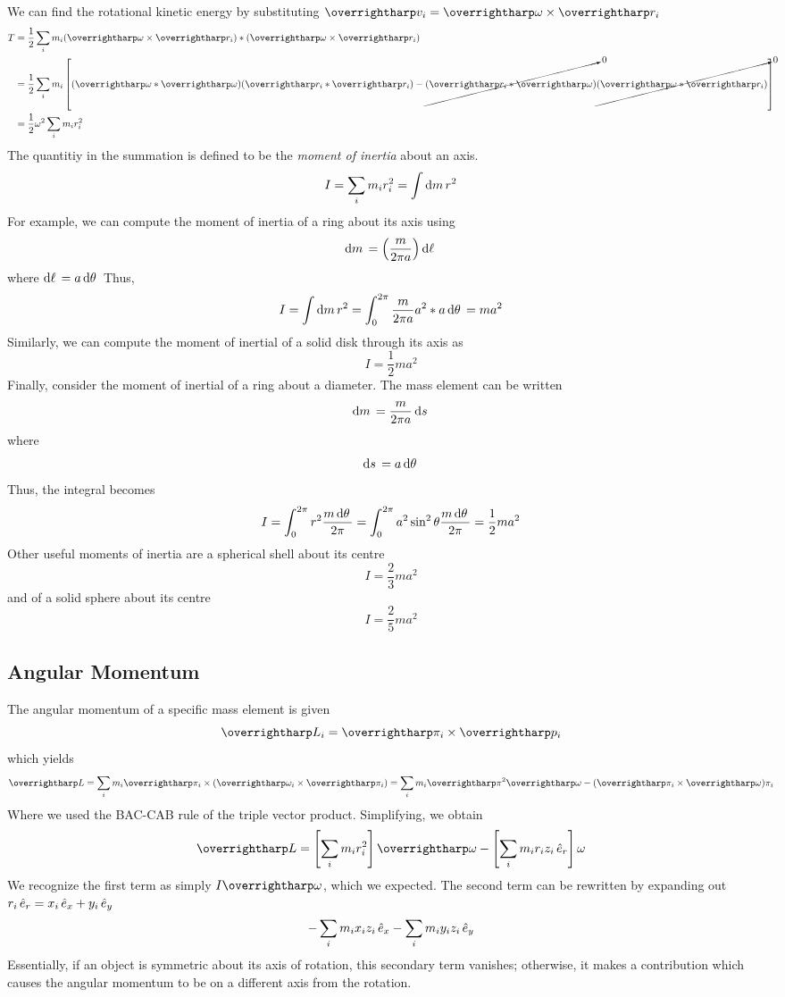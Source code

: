 We can find the rotational kinetic energy by substituting \(\vv v_i = \vv\omega \times \vv r_i\)
\begin{align}
	T&= \frac{1}{2}\sum_i m_i (\vv\omega\times \vv r_i) * (\vv\omega\times\vv r_i)\nonumber\\
	 &=\frac{1}{2}\sum_i m_i \left[ (\vv \omega*\vv\omega)(\vv r_i *\vv r_i) - \cancelto{0}{(\vv r_i * \vv\omega)}\cancelto{0}{(\vv\omega*\vv r_i)}\right]\nonumber\\
	 &=\frac{1}{2}\omega^2\sum_i m_i r_i^2
\end{align}
The quantitiy in the summation is defined to be the \emph{moment of inertia} about an axis.
\begin{equation}
	I = \sum_i m_i r_i^2 = \int\d{m}r^2
\end{equation}
For example, we can compute the moment of inertia of a ring about its axis using
\[\d{m} = \left(\frac{m}{2\pi a}\right) \d{\ell}\]
where \(\d\ell = a\d\theta\)
Thus,
\[I = \int \d{m} r^2 = \int_0^{2\pi} \frac{m}{2\pi a} a^2 * a\d\theta = m a^2\]
Similarly, we can compute the moment of inertial of a solid disk through its axis as
\[I = \frac{1}{2} ma^2\]
Finally, consider the moment of inertial of a ring about a diameter. The mass element can be written
\[\d{m} = \frac{m}{2\pi a} \d{s}\]
where
\[\d{s} = a\d\theta\]
Thus, the integral becomes
\[I = \int_{0}^{2\pi} r^2\frac{m\d\theta}{2\pi} = \int_0^{2\pi}a^2\sin^2\theta\frac{m\d\theta}{2\pi} = \frac{1}{2}ma^2\]
Other useful moments of inertia are a spherical shell about its centre
\[I = \frac{2}{3}ma^2\]
and of a solid sphere about its centre
\[I = \frac{2}{5}ma^2\]

\subsection{Angular Momentum}
The angular momentum of a specific mass element is given
\[\vv L_i = \vv{\pi_i}\times \vv p_i\]
which yields
\[\vv L = \sum_i m_i \vv \pi_i \times(\vv\omega_i \times \vv\pi_i) = \sum_i m_i \vv \pi^2 \vv\omega - (\vv\pi_i \times \vv\omega)\pi_i\]
Where we used the BAC-CAB rule of the triple vector product. Simplifying, we obtain
\[\vv L = \left[\sum_i m_i r_i^2\right]\vv\omega - \left[\sum_i m_i r_i z_i \e r\right]\omega\]
We recognize the first term as simply \(I\vv\omega\), which we expected. The second term can be rewritten by expanding out \(r_i \,\hat{e}_{r} = x_i \,\hat{e}_{x} + y_i \,\hat{e}_{y}\)
\[-\sum_i m_i x_i z_i \,\hat{e}_{x} - \sum_i m_i y_i z_i\,\hat{e}_{y}\]
Essentially, if an object is symmetric about its axis of rotation, this secondary term vanishes; otherwise, it makes a contribution which causes the angular momentum to be on a different axis from the rotation.

